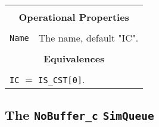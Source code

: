 \documentclass[12pt]{book}
\begin{document}
\begin{tabular}{|l|l|l|l|}
\hline
\multicolumn{4}{|c|}{} \\
\multicolumn{4}{|c|}{\bf Operational Properties} \\
\multicolumn{4}{|c|}{} \\
\hline
\lstinline|Name| & \multicolumn{3}{|l|}{The name, default "IC".} \\
\hline
\multicolumn{4}{|c|}{} \\
\multicolumn{4}{|c|}{\bf Equivalences} \\
\multicolumn{4}{|c|}{} \\
\hline
\multicolumn{4}{|l|}{\lstinline|IC| $=$ \lstinline|IS_CST[0]|.} \\
\hline
\end{tabular}

\subsection{The \lstinline{NoBuffer_c} \lstinline{SimQueue}}
\end{document}
